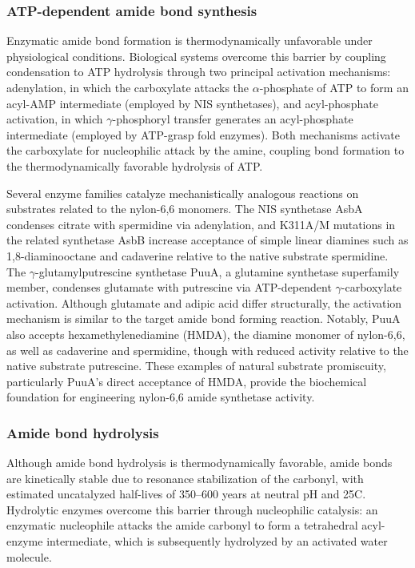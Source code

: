 \documentclass[12pt]{article}
\begin{document}
\subsubsection{ATP-dependent amide bond synthesis}
Enzymatic amide bond formation is thermodynamically unfavorable under physiological conditions. Biological systems overcome this barrier by coupling condensation to ATP hydrolysis through two principal activation mechanisms\cite{iyer2009amidoligases, lubberink2023biocatalytic}: adenylation, in which the carboxylate attacks the $\alpha$-phosphate of ATP to form an acyl-AMP intermediate (employed by NIS synthetases)\cite{oves2007enzymatic, yamanaka2008epsilon}, and acyl-phosphate activation, in which $\gamma$-phosphoryl transfer generates an acyl-phosphate intermediate (employed by ATP-grasp fold enzymes)\cite{shomura2012crystal, iyer2009amidoligases}. Both mechanisms activate the carboxylate for nucleophilic attack by the amine, coupling bond formation to the thermodynamically favorable hydrolysis of ATP.

Several enzyme families catalyze mechanistically analogous reactions on substrates related to the nylon-6,6 monomers. The NIS synthetase AsbA condenses citrate with spermidine via adenylation\cite{oves2007enzymatic}, and K311A/M mutations in the related synthetase AsbB increase acceptance of simple linear diamines such as 1,8-diaminooctane and cadaverine relative to the native substrate spermidine\cite{nusca2012functional}. The $\gamma$-glutamylputrescine synthetase PuuA, a glutamine synthetase superfamily member, condenses glutamate with putrescine via ATP-dependent $\gamma$-carboxylate activation\cite{kurihara2008gamma}. Although glutamate and adipic acid differ structurally, the activation mechanism is similar to the target amide bond forming reaction. Notably, PuuA also accepts hexamethylenediamine (HMDA), the diamine monomer of nylon-6,6, as well as cadaverine and spermidine, though with reduced activity relative to the native substrate putrescine\cite{kurihara2008gamma}. These examples of natural substrate promiscuity, particularly PuuA's direct acceptance of HMDA, provide the biochemical foundation for engineering nylon-6,6 amide synthetase activity.

\subsubsection{Amide bond hydrolysis}
Although amide bond hydrolysis is thermodynamically favorable, amide bonds are kinetically stable due to resonance stabilization of the carbonyl, with estimated uncatalyzed half-lives of 350–600 years at neutral pH and 25\textdegree C\cite{radzicka1996rates}. Hydrolytic enzymes overcome this barrier through nucleophilic catalysis: an enzymatic nucleophile attacks the amide carbonyl to form a tetrahedral acyl-enzyme intermediate, which is subsequently hydrolyzed by an activated water molecule.
\end{document}
